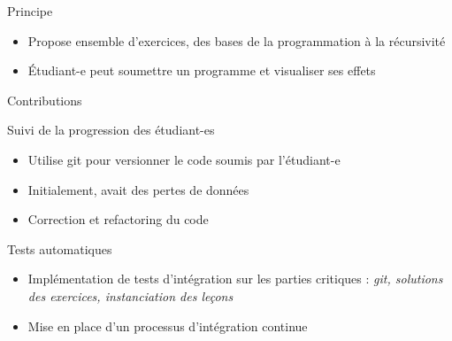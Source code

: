 \begin{frame}{Principe}
    \begin{figure}
    \end{figure}
    \vspace{-0.5cm}
    \begin{itemize}
        \item Propose ensemble d'exercices, des bases de la programmation à la récursivité
        \item Étudiant-e peut soumettre un programme et visualiser ses effets
    \end{itemize}
\end{frame}

\begin{frame}{Contributions}
    \begin{block}{Suivi de la progression des étudiant-es}
        \begin{itemize}
            \item Utilise git pour versionner le code soumis par l'étudiant-e
            \item Initialement, avait des pertes de données
            \item Correction et refactoring du code
        \end{itemize}
    \end{block}

    \begin{block}{Tests automatiques}
        \begin{itemize}
            \item Implémentation de tests d'intégration sur les parties critiques : \emph{git, solutions des exercices, instanciation des leçons}
            \item Mise en place d'un processus d'intégration continue
        \end{itemize}
    \end{block}
\end{frame}

